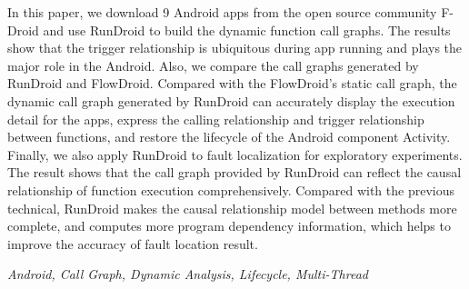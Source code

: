 In this paper, we download 9 Android apps from the open source community F-Droid and use RunDroid to build the dynamic function call graphs.
The results show that the trigger relationship is ubiquitous during app running and plays the major role in the Android.
Also, we compare the call graphs generated by RunDroid and FlowDroid.
Compared with the FlowDroid's static call graph, the dynamic call graph generated by RunDroid can accurately display the execution detail for the apps, express the calling relationship and trigger relationship between functions, and restore the lifecycle of the Android component Activity.
Finally, we also apply RunDroid to fault localization for exploratory experiments.
The result shows that the call graph provided by RunDroid can  reflect the causal relationship of function execution comprehensively.
Compared with the previous technical, RunDroid makes the causal relationship model between methods more complete, and computes more program dependency information, which helps to improve the accuracy of fault location result.





{} \textit{Android, Call Graph, Dynamic Analysis, Lifecycle, Multi-Thread}


































